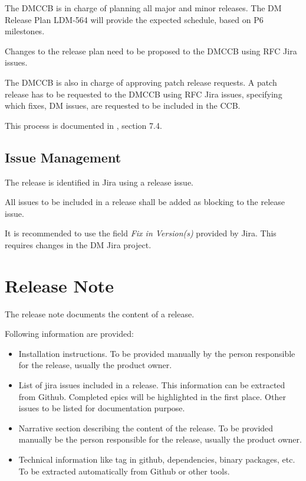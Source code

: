 The DMCCB is in charge of planning all major and minor releases.
The DM Release Plan LDM-564 will provide the expected schedule, based on P6 milestones.

Changes to the release plan need to be proposed to the DMCCB using RFC Jira issues.

The DMCCB is also in charge of approving patch release requests.
A patch release has to be requested to the DMCCB using RFC Jira issues, specifying which fixes, DM issues, are requested to be included in the CCB.

This process is documented in , section 7.4.


\subsection{Issue Management} \label{sect:issues}

The release is identified in Jira using a release issue.

All issues to be included in a release shall be added as blocking to the release issue.

It is recommended to use the field \textit{Fix in Version(s)} provided by Jira.
This requires changes in the DM Jira project.


\newpage
\section{Release Note} \label{sect:relnote}

The release note documents the content of a release.

Following information are provided:
\begin{itemize}
\item Installation instructions. To be provided manually by the person responsible for the release, usually the product owner.
\item List of jira issues included in a release. This information can be extracted from Github. Completed epics will be highlighted in the first place. Other issues to be listed for documentation purpose. 
\item Narrative section describing the content of the release. To be provided manually be the person responsible for the release, usually the product owner.
\item Technical information like tag in github, dependencies, binary packages, etc. To be extracted automatically from Github or other tools.
\end{itemize}

